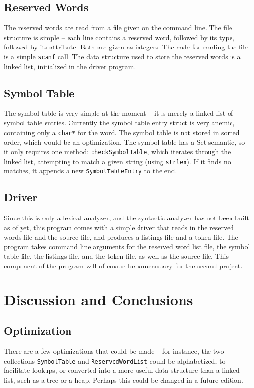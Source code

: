 \documentclass[titlepage]{article}
\begin{document}
		\subsection{Reserved Words}
			The reserved words are read from a file given on the command line. The file structure is simple -- each line contains a reserved word, followed by its type, followed by its attribute. Both are given as integers. The code for reading the file is a simple \texttt{scanf} call. The data structure used to store the reserved words is a linked list, initialized in the driver program.
		\subsection{Symbol Table}
			The symbol table is very simple at the moment -- it is merely a linked list of symbol table entries. Currently the symbol table entry struct is very anemic, containing only a \texttt{char*} for the word. The symbol table is not stored in sorted order, which would be an optimization. The symbol table has a Set semantic, so it only requires one method: \texttt{checkSymbolTable}, which iterates through the linked list, attempting to match a given string (using \texttt{strlen}). If it finds no matches, it appends a new \texttt{SymbolTableEntry} to the end.
		\subsection{Driver}
			Since this is only a lexical analyzer, and the syntactic analyzer has not been built as of yet, this program comes with a simple driver that reads in the reserved words file and the source file, and produces a listings file and a token file. The program takes command line arguments for the reserved word list file, the symbol table file, the listings file, and the token file, as well as the source file. This component of the program will of course be unnecessary for the second project.
	\section{Discussion and Conclusions}
		\subsection{Optimization}
			There are a few optimizations that could be made -- for instance, the two collections \texttt{SymbolTable} and \texttt{ReservedWordList} could be alphabetized, to facilitate lookups, or converted into a more useful data structure than a linked list, such as a tree or a heap. Perhaps this could be changed in a future edition.
\end{document}
